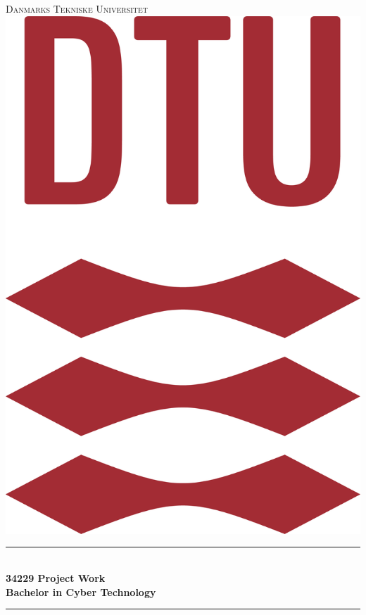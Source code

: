 \begin{titlepage}

\newcommand{\HRule}{\rule{\linewidth}{0.5mm}}

\center

\textsc{\Large Danmarks Tekniske Universitet}\\[1.5cm]

\includegraphics[scale=0.15]{Billeder/DTULogo.png}\\[0.4cm]

\HRule\\[0.5cm]

{\huge\bfseries 34229 Project Work\\ Bachelor in Cyber Technology}\\[0.4cm]

\HRule\\[0.5cm]


\end{titlepage}
